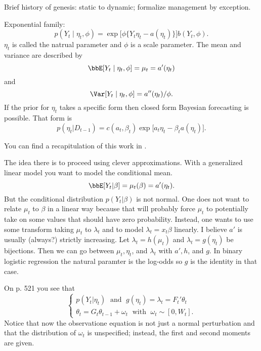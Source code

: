 \documentclass{article}
\begin{document}
\begin{outline}

\1 Brief history of genesis: static to dynamic; formalize management by exception.

\1 Exponential family:
\[
p(Y_t \mid \eta_t, \phi) = \exp \Big[ \phi \Big\{Y_t \eta_t - a(\eta_t)\Big\}
\Big]
b(Y_t, \phi).
\]
$\eta_t$ is called the natrual parameter and $\phi$ is a scale parameter.  The
mean and variance are described by
\[
\bbE[Y_t \mid \eta_t, \phi] = \mu_t = a'(\eta_t)
\]
and
\[
\Var[Y_t \mid \eta_t, \phi] = a''(\eta_t) / \phi.
\]
If the prior for $\eta_t$ takes a specific form then closed form Bayesian
forecasting is possible.  That form is
\[
p(\eta_t | D_{t-1}) = c(a_t, \beta_t) 
\exp \Big[ a_t \eta_t - \beta_t a(\eta_t) \Big].
\]

\1 You can find a recapitulation of this work in \cite{harrison-west-1997}.

The idea there is to proceed using clever approximations.  With a generalized
linear model you want to model the conditional mean.
\[
\bbE[Y_t | \beta] = \mu_t(\beta) = a'(\eta_t).
\]
But the conditional distribution $p(Y_t | \beta)$ is not normal.  One does not
want to relate $\mu_t$ to $\beta$ in a linear way because that will probably
force $\mu_t$ to potentially take on some values that should have zero
probability.  Instead, one wants to use some transform taking $\mu_t$ to
$\lambda_t$ and to model $\lambda_t = x_t \beta$ linearly.  I believe $a'$ is
usually (always?) strictly increasing.  Let $\lambda_t = h(\mu_t)$ and
$\lambda_t = g(\eta_t)$ be bijections.  Then we can go between $\mu_t, \eta_t$,
and $\lambda_t$ with $a', h$, and $g$.  In binary logistic regression the
natural paramter is the log-odds so $g$ is the identity in that case.

\2 On p. 521 you see that
\[
\begin{cases}
p(Y_t | \eta_t) \; \text{ and } \; g(\eta_t) = \lambda_t = F_t' \theta_t \\
\theta_t = G_t \theta_{t-1} + \omega_t \; \text{ with } \; \omega_t \sim [0, W_t].
\end{cases}
\]
Notice that now the observatione equation is not just a normal perturbation and
that the distribution of $\omega_t$ is unspecified; instead, the first and
second moments are given.


\end{outline}
\end{document}
